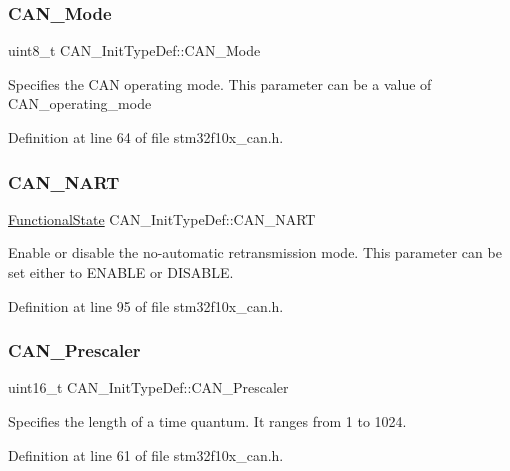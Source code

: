 \subsubsection{\texorpdfstring{C\+A\+N\+\_\+\+Mode}{CAN\_Mode}}
{\footnotesize\ttfamily uint8\+\_\+t C\+A\+N\+\_\+\+Init\+Type\+Def\+::\+C\+A\+N\+\_\+\+Mode}

Specifies the C\+AN operating mode. This parameter can be a value of C\+A\+N\+\_\+operating\+\_\+mode 

Definition at line 64 of file stm32f10x\+\_\+can.\+h.

\mbox{\label{struct_c_a_n___init_type_def_a5adeac1b7b47f2b91e667eddc181ac09}} 
\subsubsection{\texorpdfstring{C\+A\+N\+\_\+\+N\+A\+RT}{CAN\_NART}}
{\footnotesize\ttfamily \hyperlink{group___exported__types_gac9a7e9a35d2513ec15c3b537aaa4fba1}{Functional\+State} C\+A\+N\+\_\+\+Init\+Type\+Def\+::\+C\+A\+N\+\_\+\+N\+A\+RT}

Enable or disable the no-\/automatic retransmission mode. This parameter can be set either to E\+N\+A\+B\+LE or D\+I\+S\+A\+B\+LE. 

Definition at line 95 of file stm32f10x\+\_\+can.\+h.

\mbox{\label{struct_c_a_n___init_type_def_a3e91dbcbf30b893a9bd6a65606cb8fe9}} 
\subsubsection{\texorpdfstring{C\+A\+N\+\_\+\+Prescaler}{CAN\_Prescaler}}
{\footnotesize\ttfamily uint16\+\_\+t C\+A\+N\+\_\+\+Init\+Type\+Def\+::\+C\+A\+N\+\_\+\+Prescaler}

Specifies the length of a time quantum. It ranges from 1 to 1024. 

Definition at line 61 of file stm32f10x\+\_\+can.\+h.

